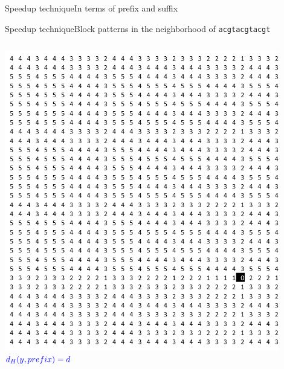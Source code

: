 \documentclass[pdf,xcolor={dvipsnames}]{beamer}
\begin{document}
\begin{frame}{Speedup technique}{In terms of prefix and suffix}
\begin{itemize}
{			}
		\end{itemize}
		\end{frame}

	\begin{frame}{Speedup technique}{Block patterns in the neighborhood of \texttt{acgtacgtacgt}}
		\centering
		\begin{columns}
			\footnotesize
			\begin{column}{0.3\textwidth}
				\centering
				\includegraphics[width=0.9\textwidth]{img/0.png}\\ $\color{blue}d_H(y,prefix) = d$\\\ \\

\end{column}
\end{columns}
\end{frame}
\end{document}
